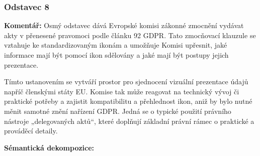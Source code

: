 
\subsubsection{Odstavec 8}
\label{sec:odstavec-8}
\begin{displayquote}  \cite{clanek12}
\end{displayquote}

\noindent \textbf{Komentář:}
Osmý odstavec dává Evropské komisi zákonné zmocnění vydávat akty v přenesené pravomoci podle článku 92 GDPR. Tato zmocňovací klauzule se vztahuje ke standardizovaným ikonám a umožňuje Komisi upřesnit, jaké informace mají být pomocí ikon sdělovány a jaké mají být postupy jejich prezentace.

Tímto ustanovením se vytváří prostor pro sjednocení vizuální prezentace údajů napříč členskými státy EU. Komise tak může reagovat na technický vývoj či praktické potřeby a zajistit kompatibilitu a přehlednost ikon, aniž by bylo nutné měnit samotné znění nařízení GDPR. Jedná se o typické použití právního nástroje „delegovaných aktů“, které doplňují základní právní rámec o praktické a prováděcí detaily.

\vspace{1em}

\noindent \textbf{Sémantická dekompozice:}


